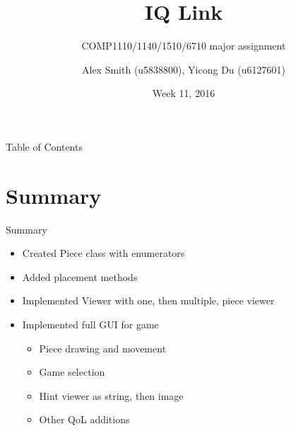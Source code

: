 \documentclass[12pt]{beamer}
\title{IQ Link}
\subtitle{COMP1110/1140/1510/6710 major assignment}
\author[u5838800, u6127601]{Alex Smith (u5838800), Yicong Du (u6127601)}
\date{Week 11, 2016}
\begin{document}

\frame{\titlepage}
\begin{frame}{Table of Contents}
	\tableofcontents[currentsection]
\end{frame}

\section{Summary}
\begin{frame}{Summary}
	\begin{itemize}
	\item Created Piece class with enumerators
	\item Added placement methods
	\item Implemented Viewer with one, then multiple, piece viewer
	\item Implemented full GUI for game
		\begin{itemize}
		\item Piece drawing and movement
		\item Game selection
		\item Hint viewer as string, then image
		\item Other QoL additions
		\end{itemize}
	\end{itemize}
\end{frame}
\end{document}
